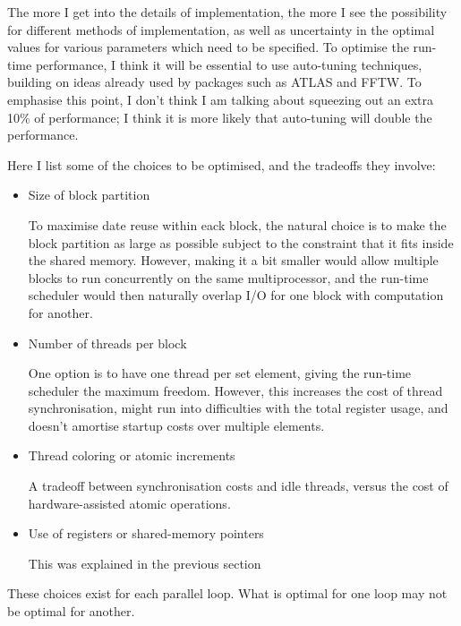 \documentclass[12pt]{article}
\begin{document}
The more I get into the details of implementation, the more I see
the possibility for different methods of implementation, as well
as uncertainty in the optimal values for various parameters which
need to be specified.   To optimise the run-time performance, I 
think it will be essential to use auto-tuning techniques, building 
on ideas already used by packages such as ATLAS and FFTW.  To
emphasise this point, I don't think I am talking about squeezing 
out an extra 10\% of performance; I think it is more likely that
auto-tuning will double the performance.


Here I list some of the choices to be optimised, and the tradeoffs
they involve:
\begin{itemize}
\item
Size of block partition

To maximise date reuse within eack block, the natural choice is 
to make the block partition as large as possible subject to the
constraint that it fits inside the shared memory.  However, 
making it a bit smaller would allow multiple blocks to run 
concurrently on the same multiprocessor, and the run-time 
scheduler would then naturally overlap I/O for one block
with computation for another.

\item
Number of threads per block

One option is to have one thread per set element, giving the 
run-time scheduler the maximum freedom.  However, this increases
the cost of thread synchronisation, might run into difficulties 
with the total register usage, and doesn't amortise startup 
costs over multiple elements.

\item
Thread coloring or atomic increments

A tradeoff between synchronisation costs and idle threads, 
versus the cost of hardware-assisted atomic operations.

\item
Use of registers or shared-memory pointers

This was explained in the previous section
\end{itemize}


These choices exist for each parallel loop.  What is optimal 
for one loop may not be optimal for another.
\end{document}
